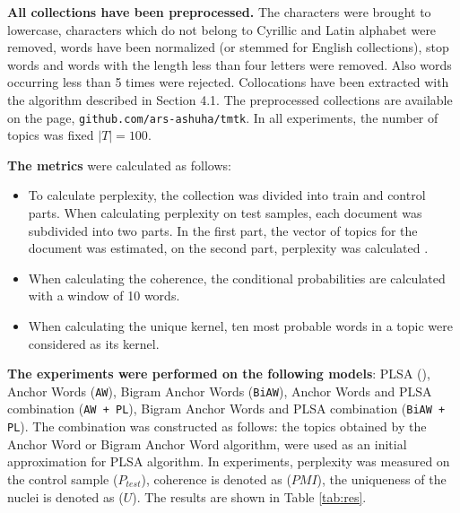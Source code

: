 \documentclass[runningheads,a4paper]{llncs}
\begin{document}
   \noindent \textbf{All collections have been preprocessed.} The characters were brought to lowercase, characters which do not belong to Cyrillic and Latin alphabet were removed, words have been normalized (or stemmed for English collections), stop words and words with the length less than four letters were removed. Also words occurring less than 5 times were rejected. Collocations have been extracted with the algorithm described in Section 4.1. The preprocessed collections are available on the page, \texttt{github.com/ars-ashuha/tmtk}. In all experiments,  the number of topics was fixed $|T| = 100$.
   
	\noindent \textbf{The metrics} were calculated as follows:
	\begin{itemize}
		\item To calculate perplexity, the collection was divided into train and control parts. When calculating perplexity on test samples, each document was subdivided into two parts. In the first part, the vector of topics for the document was estimated, on the second part, perplexity was calculated . 
		\item When calculating the coherence, the conditional probabilities are calculated with a window of 10 words.
		\item When calculating the unique kernel, ten most probable words in a topic were considered as its kernel.
	\end{itemize}
	
	\noindent \textbf {The experiments were performed on the following models}: PLSA (), Anchor Words (\texttt {AW}), Bigram Anchor Words (\texttt{BiAW}), Anchor Words and PLSA combination (\texttt{AW + PL}), Bigram Anchor Words and PLSA combination (\texttt{BiAW + PL}). The combination was constructed as follows: the topics obtained by the Anchor Word or Bigram Anchor Word algorithm, were used as an initial approximation for PLSA algorithm. In experiments, perplexity was measured on the control sample (\textit{$ P_ {test}$}), coherence is denoted as (\textit{$PMI$}), the uniqueness of the nuclei is denoted as (\textit{$U$}). The results are shown in Table \ref{tab:res}.
\end{document}

